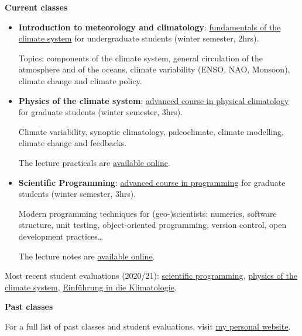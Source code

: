 \textbf{Current classes}
\begin{itemize}[nosep]
\item {} 
\textbf{Introduction to meteorology and climatology}:
\href{https://orawww.uibk.ac.at/public/lfuonline\_lv.details?sem\_id\_in=16W\&lvnr\_id\_in=707606}{fundamentals of the climate system}
for undergraduate students (winter semester, 2hrs).

Topics: components of the
climate system, general circulation of the atmosphere and of the oceans,
climate variability (ENSO, NAO, Monsoon), climate change and climate policy.

\item {} 
\textbf{Physics of the climate system}: \href{https://orawww.uibk.ac.at/public/lfuonline\_lv.details?sem\_id\_in=15W\&lvnr\_id\_in=707712}{advanced course in physical climatology}
for graduate students (winter semester, 3hrs).

Climate variability, synoptic climatology, paleoclimate, climate modelling,
climate change and feedbacks.

The lecture practicals are \href{http://fabienmaussion.info/climate\_system/}{available online}.

\item {} 
\textbf{Scientific Programming}: \href{https://orawww.uibk.ac.at/public/lfuonline\_lv.details?sem\_id\_in=18S\&lvnr\_id\_in=707716}{advanced course in programming}
for graduate students (winter semester, 3hrs).

Modern programming techniques for (geo-)scientists:
numerics, software structure, unit testing, object-oriented programming, version control, open development practices…

The lecture notes are \href{http://fabienmaussion.info/scientific\_programming/}{available online}.

\end{itemize}

Most recent student evaluations (2020/21):
\href{https://fabienmaussion.info/images/teaching/eval/2020WS\_SciPro.pdf}{scientific programming},
\href{https://fabienmaussion.info/images/teaching/eval/2020WS\_PhyClim.pdf}{physics of the climate system},
\href{https://fabienmaussion.info/images/teaching/eval/2020WS\_EKlim.pdf}{Einführung in die Klimatologie}.

\textbf{Past classes}

For a full list of past classes and student evaluations, visit \href{https://fabienmaussion.info/teaching/}{my personal website}.


